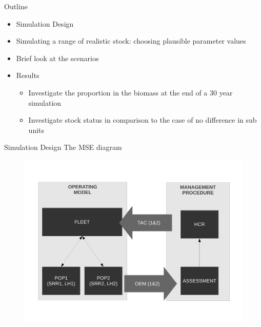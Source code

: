\documentclass{beamer}
\begin{document}
\begin{withoutheadline}
\begin{frame}{Outline}
  \begin{itemize}
    \item Simulation Design
    \item Simulating a range of realistic stock: choosing plausible parameter values
    \item Brief look at the scenarios
    \item Results    
    \begin{itemize}
      \item Investigate the proportion in the biomass at the end of a 30 year simulation
      \item Investigate stock status in comparison to the case of no difference in sub units
    \end{itemize}
  \end{itemize}
\end{frame}
\end{withoutheadline}



\begin{withoutheadline}
\begin{frame}{Simulation Design}
  The MSE diagram
  \begin{figure}
    \centering
    \includegraphics[width=.9\textwidth]{mse02}
  \end{figure}
\end{frame}
\end{withoutheadline}
\end{document}
